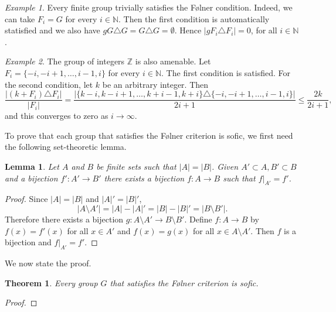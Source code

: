 \documentclass[titlepage, a4paper]{article}
\newcommand{\N}{\mathbb{N}}
\newcommand{\Z}{\mathbb{Z}}
\newcommand{\card}[1]{\left| #1 \right|}
\newtheorem{theorem}{Theorem}
\newtheorem{lemma}{Lemma}
\theoremstyle{remark}
\newtheorem{example}{Example}
\begin{document}
\begin{example}\label{ex:finite_group_folner}
    Every finite group trivially satisfies the Følner condition. Indeed, we can take $F_i = G$ for every $i \in \N$. Then the first condition is automatically statisfied and we also have $gG \triangle G = G \triangle G = \emptyset$. Hence $\card{gF_i\triangle F_i} = 0$, for all $i \in \N$.
\end{example}

\begin{example}\label{ex:integers_folner}
    The group of integers $\Z$ is also amenable. Let $F_i = \{-i, -i+1, \dots, i-1, i\}$ for every $i \in \N$. The first condition is satisfied. For the second condition, let $k$ be an arbitrary integer. Then
    \[
        \frac{\card{(k + F_i) \triangle F_i}}{\card{F_i}}
        = \frac{\card{\{k-i, k-i+1, \dots, k+i-1, k+i\}\triangle \{-i, -i+1, \dots, i-1, i\}}}{2i+1}
        \leq \frac{2k}{2i+1},
    \]
    and this converges to zero as $i \to \infty$.
\end{example}


To prove that each group that satisfies the Følner criterion is sofic, we first need the following set-theoretic lemma.

\begin{lemma}\label{lem:finite_bijections} 
        Let $A$ and $B$ be finite sets such that $|A| = |B|$. Given $A' \subset A, B' \subset B$ and a bijection $f': A' \to B'$ there exists a bijection $f: A \to B$ such that $f|_{A'} = f'$. 
    \end{lemma}
    \begin{proof}
        Since $\card A = \card B$ and $\card A' = \card B'$,
        \[
        \card{A \setminus A'} = \card A - \card A' = \card B - \card B' = \card{B \setminus B'}.
        \]
        Therefore there exists a bijection $g: A \setminus A' \to B \setminus B'$. Define $f: A  \to B$ by $f(x) = f'(x)$ for all $x \in A'$ and $f(x)=g(x)$ for all $x \in A \setminus A'$. Then $f$ is a bijection and $f|_{A'} = f'$.
    \end{proof}

We now state the proof.

 	\begin{theorem}\label{thm:folner_sofic}
        Every group $G$ that satisfies the Følner criterion is sofic.
    \end{theorem}
    \begin{proof}
        
 	\end{proof}
\end{document}
